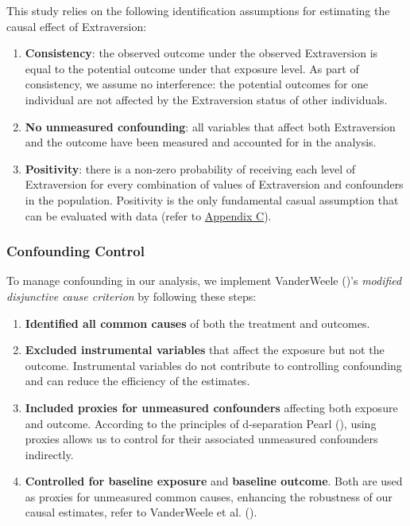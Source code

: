 \documentclass[
  single column]{article}
\providecommand{\tightlist}{%
  \setlength{\itemsep}{0pt}\setlength{\parskip}{0pt}}
\begin{document}
This study relies on the following identification assumptions for
estimating the causal effect of Extraversion:

\begin{enumerate}
\def\labelenumi{\arabic{enumi}.}
\item
  \textbf{Consistency}: the observed outcome under the observed
  Extraversion is equal to the potential outcome under that exposure
  level. As part of consistency, we assume no interference: the
  potential outcomes for one individual are not affected by the
  Extraversion status of other individuals.
\item
  \textbf{No unmeasured confounding}: all variables that affect both
  Extraversion and the outcome have been measured and accounted for in
  the analysis.
\item
  \textbf{Positivity}: there is a non-zero probability of receiving each
  level of Extraversion for every combination of values of Extraversion
  and confounders in the population. Positivity is the only fundamental
  casual assumption that can be evaluated with data (refer to
  \hyperref[appendix-positivity]{Appendix C}).
\end{enumerate}

\subsubsection{Confounding Control}\label{confounding-control}

To manage confounding in our analysis, we implement VanderWeele
()'s \emph{modified disjunctive
cause criterion} by following these steps:

\begin{enumerate}
\def\labelenumi{\arabic{enumi}.}
\tightlist
\item
  \textbf{Identified all common causes} of both the treatment and
  outcomes.
\item
  \textbf{Excluded instrumental variables} that affect the exposure but
  not the outcome. Instrumental variables do not contribute to
  controlling confounding and can reduce the efficiency of the
  estimates.
\item
  \textbf{Included proxies for unmeasured confounders} affecting both
  exposure and outcome. According to the principles of d-separation
  Pearl (), using proxies allows us to
  control for their associated unmeasured confounders indirectly.
\item
  \textbf{Controlled for baseline exposure} and \textbf{baseline
  outcome}. Both are used as proxies for unmeasured common causes,
  enhancing the robustness of our causal estimates, refer to VanderWeele
  et al. ().
\end{enumerate}
\end{document}
